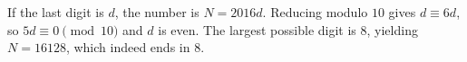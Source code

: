 If the last digit is $d$, the number is $N=2016d$. Reducing modulo $10$ gives $d\equiv6d$, so $5d\equiv0\pmod{10}$ and $d$ is even. The largest possible digit is $8$, yielding $\boxed{N=16128}$, which indeed ends in $8$.
